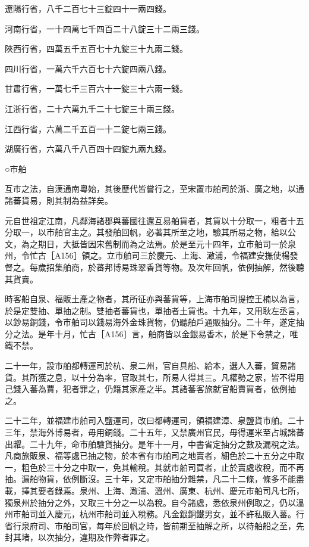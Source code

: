 \begin{pinyinscope}
 遼陽行省，八千二百七十三錠四十一兩四錢。



 河南行省，一十四萬七千四百二十八錠三十二兩三錢。



 陜西行省，四萬五千五百七十九錠三十九兩二錢。



 四川行省，一萬六千六百七十六錠四兩八錢。



 甘肅行省，一萬七千三百六十一錠三十六兩一錢。



 江浙行省，二十六萬九千二十七錠三十兩三錢。



 江西行省，六萬二千五百一十二錠七兩三錢。



 湖廣行省，六萬八千八百四十四錠九兩九錢。



 ○市舶



 互市之法，自漢通南粵始，其後歷代皆嘗行之，至宋置市舶司於浙、廣之地，以通諸蕃貨易，則其制為益詳矣。



 元自世祖定江南，凡鄰海諸郡與蕃國往還互易舶貨者，其貨以十分取一，粗者十五分取一，以市舶官主之。其發舶回帆，必著其所至之地，驗其所易之物，給以公文，為之期日，大抵皆因宋舊制而為之法焉。於是至元十四年，立市舶司一於泉州，令忙古［A156］領之。立市舶司三於慶元、上海、澉浦，令福建安撫使楊發督之。每歲招集舶商，於蕃邦博易珠翠香貨等物。及次年回帆，依例抽解，然後聽其貨賣。



 時客船自泉、福販土產之物者，其所征亦與蕃貨等，上海市舶司提控王楠以為言，於是定雙抽、單抽之制。雙抽者蕃貨也，單抽者土貨也。十九年，又用耿左丞言，以鈔易銅錢，令市舶司以錢易海外金珠貨物，仍聽舶戶通販抽分。二十年，遂定抽分之法。是年十月，忙古［A156］言，舶商皆以金銀易香木，於是下令禁之，唯鐵不禁。



 二十一年，設市舶都轉運司於杭、泉二州，官自具船、給本，選人入蕃，貿易諸貨。其所獲之息，以十分為率，官取其七，所易人得其三。凡權勢之家，皆不得用己錢入蕃為賈，犯者罪之，仍籍其家產之半。其諸蕃客旅就官船賣買者，依例抽之。



 二十二年，並福建市舶司入鹽運司，改曰都轉運司，領福建漳、泉鹽貨市舶。二十三年，禁海外博易者，毋用銅錢。二十五年，又禁廣州官民，毋得運米至占城諸蕃出糶。二十九年，命市舶驗貨抽分。是年十一月，中書省定抽分之數及漏稅之法。凡商旅販泉、福等處已抽之物，於本省有市舶司之地賣者，細色於二十五分之中取一，粗色於三十分之中取一，免其輸稅。其就市舶司買者，止於賣處收稅，而不再抽。漏舶物貨，依例斷沒。三十年，又定市舶抽分雜禁，凡二十二條，條多不能盡載，擇其要者錄焉。泉州、上海、澉浦、溫州、廣東、杭州、慶元市舶司凡七所，獨泉州於抽分之外，又取三十分之一以為稅。自今諸處，悉依泉州例取之，仍以溫州市舶司並入慶元，杭州市舶司並入稅務。凡金銀銅鐵男女，並不許私販入蕃。行省行泉府司、市舶司官，每年於回帆之時，皆前期至抽解之所，以待舶船之至，先封其堵，以次抽分，違期及作弊者罪之。




\end{pinyinscope}

